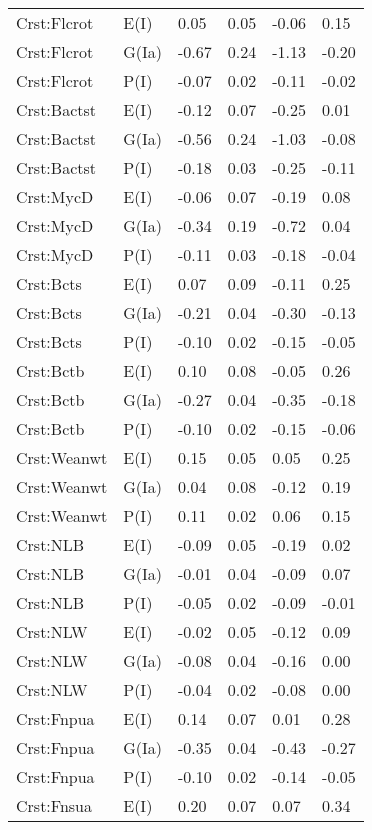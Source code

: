 \begin{center}
\begin{longtable}{|p{1.1in}|p{0.7in}|p{0.7in}|p{0.6in}|p{0.6in}|p{0.6in}|}
  Crst:Flcrot & E(I) & 0.05 & 0.05 & -0.06 & 0.15 \\ 
  Crst:Flcrot & G(Ia) & -0.67 & 0.24 & -1.13 & -0.20 \\ 
  Crst:Flcrot & P(I) & -0.07 & 0.02 & -0.11 & -0.02 \\ 
  Crst:Bactst & E(I) & -0.12 & 0.07 & -0.25 & 0.01 \\ 
  Crst:Bactst & G(Ia) & -0.56 & 0.24 & -1.03 & -0.08 \\ 
  Crst:Bactst & P(I) & -0.18 & 0.03 & -0.25 & -0.11 \\ 
  Crst:MycD & E(I) & -0.06 & 0.07 & -0.19 & 0.08 \\ 
  Crst:MycD & G(Ia) & -0.34 & 0.19 & -0.72 & 0.04 \\ 
  Crst:MycD & P(I) & -0.11 & 0.03 & -0.18 & -0.04 \\ 
  Crst:Bcts & E(I) & 0.07 & 0.09 & -0.11 & 0.25 \\ 
  Crst:Bcts & G(Ia) & -0.21 & 0.04 & -0.30 & -0.13 \\ 
  Crst:Bcts & P(I) & -0.10 & 0.02 & -0.15 & -0.05 \\ 
  Crst:Bctb & E(I) & 0.10 & 0.08 & -0.05 & 0.26 \\ 
  Crst:Bctb & G(Ia) & -0.27 & 0.04 & -0.35 & -0.18 \\ 
  Crst:Bctb & P(I) & -0.10 & 0.02 & -0.15 & -0.06 \\ 
  Crst:Weanwt & E(I) & 0.15 & 0.05 & 0.05 & 0.25 \\ 
  Crst:Weanwt & G(Ia) & 0.04 & 0.08 & -0.12 & 0.19 \\ 
  Crst:Weanwt & P(I) & 0.11 & 0.02 & 0.06 & 0.15 \\ 
  Crst:NLB & E(I) & -0.09 & 0.05 & -0.19 & 0.02 \\ 
  Crst:NLB & G(Ia) & -0.01 & 0.04 & -0.09 & 0.07 \\ 
  Crst:NLB & P(I) & -0.05 & 0.02 & -0.09 & -0.01 \\ 
  Crst:NLW & E(I) & -0.02 & 0.05 & -0.12 & 0.09 \\ 
  Crst:NLW & G(Ia) & -0.08 & 0.04 & -0.16 & 0.00 \\ 
  Crst:NLW & P(I) & -0.04 & 0.02 & -0.08 & 0.00 \\ 
  Crst:Fnpua & E(I) & 0.14 & 0.07 & 0.01 & 0.28 \\ 
  Crst:Fnpua & G(Ia) & -0.35 & 0.04 & -0.43 & -0.27 \\ 
  Crst:Fnpua & P(I) & -0.10 & 0.02 & -0.14 & -0.05 \\ 
  Crst:Fnsua & E(I) & 0.20 & 0.07 & 0.07 & 0.34 \\ 

\end{longtable}
\end{center}
